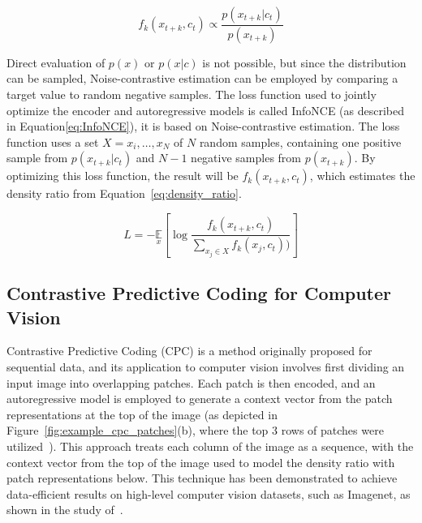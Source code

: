 \begin{equation}
	f_k(x_{t+k}, c_t) \propto \frac{p(x_{t+k}|c_t)}{p(x_{t+k})}
	\label{eq:density_ratio}
\end{equation}

Direct evaluation of $p(x)$ or $p(x|c)$ is not possible, but since the distribution can be sampled, Noise-contrastive estimation \citep{gutmann2010noise} can be employed by comparing a target value to random negative samples. The loss function used to jointly optimize the encoder and autoregressive models is called InfoNCE (as described in Equation\ref{eq:InfoNCE}), it is based on Noise-contrastive estimation. The loss function uses a set $X={x_i,…,x_N}$ of $N$ random samples, containing one positive sample from $p(x_{t+k}|c_t)$ and $N-1$ negative samples from $p(x_{t+k})$. By optimizing this loss function, the result will be $f_k(x_{t+k}, c_t)$, which estimates the density ratio from Equation~\ref{eq:density_ratio}.

\begin{equation}
	L=-\underset{x}{\mathbb{E}}\left[\log\frac{f_k(x_{t+k},c_t)}{\sum_{x_j\in X}f_k(x_j,c_t))}\right]
	\label{eq:InfoNCE}
\end{equation} 

\subsection{Contrastive Predictive Coding for Computer Vision}
\label{subsec:unsupervised_cpc_for_vision}
Contrastive Predictive Coding (CPC) is a method originally proposed for sequential data, and its application to computer vision involves first dividing an input image into overlapping patches. Each patch is then encoded, and an autoregressive model is employed to generate a context vector from the patch representations at the top of the image (as depicted in Figure~\ref{fig:example_cpc_patches}(b), where the top 3 rows of patches were utilized~\citep{oord2018representation}). This approach treats each column of the image as a sequence, with the context vector from the top of the image used to model the density ratio with patch representations below. This technique has been demonstrated to achieve data-efficient results on high-level computer vision datasets, such as Imagenet, as shown in the study of~\cite{deng2009imagenet}.

